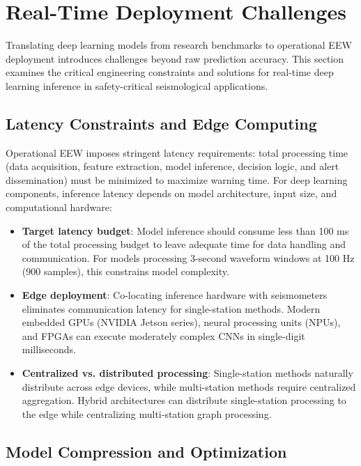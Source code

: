 \documentclass[review,authoryear]{elsarticle}
\begin{document}
\section{Real-Time Deployment Challenges}
\label{sec:deployment}

Translating deep learning models from research benchmarks to operational EEW deployment introduces challenges beyond raw prediction accuracy. This section examines the critical engineering constraints and solutions for real-time deep learning inference in safety-critical seismological applications.

\subsection{Latency Constraints and Edge Computing}

Operational EEW imposes stringent latency requirements: total processing time (data acquisition, feature extraction, model inference, decision logic, and alert dissemination) must be minimized to maximize warning time. For deep learning components, inference latency depends on model architecture, input size, and computational hardware:

\begin{itemize}
\item \textbf{Target latency budget}: Model inference should consume less than 100 ms of the total processing budget to leave adequate time for data handling and communication. For models processing 3-second waveform windows at 100 Hz (900 samples), this constrains model complexity.
\item \textbf{Edge deployment}: Co-locating inference hardware with seismometers eliminates communication latency for single-station methods. Modern embedded GPUs (NVIDIA Jetson series), neural processing units (NPUs), and FPGAs can execute moderately complex CNNs in single-digit milliseconds.
\item \textbf{Centralized vs. distributed processing}: Single-station methods naturally distribute across edge devices, while multi-station methods require centralized aggregation. Hybrid architectures can distribute single-station processing to the edge while centralizing multi-station graph processing.
\end{itemize}

\subsection{Model Compression and Optimization}
\end{document}
